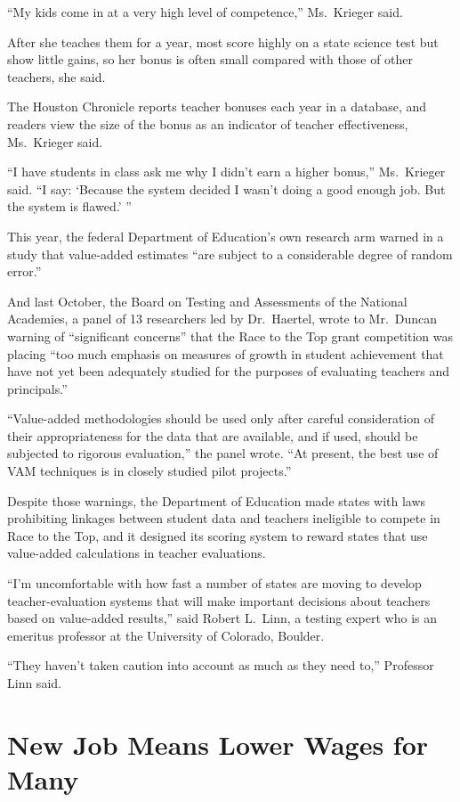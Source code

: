 ﻿\documentclass[12pt]{article}
\begin{document}
``My kids come in at a very high level of competence,'' Ms.~Krieger said.

After she teaches them for a year, most score highly on a state science test but show little gains,
so her bonus is often small compared with those of other teachers, she said.

The Houston Chronicle reports teacher bonuses each year in a database, and readers view the size of
the bonus as an indicator of teacher effectiveness, Ms.~Krieger said.

``I have students in class ask me why I didn't earn a higher bonus,'' Ms.~Krieger said. ``I say:
`Because the system decided I wasn't doing a good enough job. But the system is flawed.' ''

This year, the federal Department of Education's own research arm warned in a study that value-added
estimates ``are subject to a considerable degree of random error.''

And last October, the Board on Testing and Assessments of the National Academies, a panel of 13
researchers led by Dr.~Haertel, wrote to Mr.~Duncan warning of ``significant concerns'' that the
Race to the Top grant competition was placing ``too much emphasis on measures of growth in student
achievement that have not yet been adequately studied for the purposes of evaluating teachers and
principals.''

``Value-added methodologies should be used only after careful consideration of their appropriateness
for the data that are available, and if used, should be subjected to rigorous evaluation,'' the
panel wrote. ``At present, the best use of VAM techniques is in closely studied pilot projects.''

Despite those warnings, the Department of Education made states with laws prohibiting linkages
between student data and teachers ineligible to compete in Race to the Top, and it designed its
scoring system to reward states that use value-added calculations in teacher evaluations.

``I'm uncomfortable with how fast a number of states are moving to develop teacher-evaluation
systems that will make important decisions about teachers based on value-added results,'' said
Robert L.~Linn, a testing expert who is an emeritus professor at the University of Colorado,
Boulder.

``They haven't taken caution into account as much as they need to,'' Professor Linn said.

\pagebreak
\section{New Job Means Lower Wages for Many}
\end{document}
